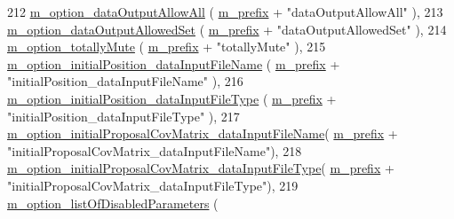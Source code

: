 \begin{DoxyCode}
212   \hyperlink{class_q_u_e_s_o_1_1_metropolis_hastings_s_g_options_a6d1f0f09fa5e238a54c6269c48fc6b29}{m\_option\_dataOutputAllowAll}                        (
      \hyperlink{class_q_u_e_s_o_1_1_metropolis_hastings_s_g_options_a4f7c510aaa530336d24259e2a89f5d0b}{m\_prefix} + \textcolor{stringliteral}{"dataOutputAllowAll"}                        ),
213   \hyperlink{class_q_u_e_s_o_1_1_metropolis_hastings_s_g_options_a7d12ea603c8aba9215ad462d51720204}{m\_option\_dataOutputAllowedSet}                      (
      \hyperlink{class_q_u_e_s_o_1_1_metropolis_hastings_s_g_options_a4f7c510aaa530336d24259e2a89f5d0b}{m\_prefix} + \textcolor{stringliteral}{"dataOutputAllowedSet"}                      ),
214   \hyperlink{class_q_u_e_s_o_1_1_metropolis_hastings_s_g_options_adc30bd8388e2da2b063671fc5ccad850}{m\_option\_totallyMute}                               (
      \hyperlink{class_q_u_e_s_o_1_1_metropolis_hastings_s_g_options_a4f7c510aaa530336d24259e2a89f5d0b}{m\_prefix} + \textcolor{stringliteral}{"totallyMute"}                               ),
215   \hyperlink{class_q_u_e_s_o_1_1_metropolis_hastings_s_g_options_a2dbb00eec372f529d21f770b0f220bd9}{m\_option\_initialPosition\_dataInputFileName}         (
      \hyperlink{class_q_u_e_s_o_1_1_metropolis_hastings_s_g_options_a4f7c510aaa530336d24259e2a89f5d0b}{m\_prefix} + \textcolor{stringliteral}{"initialPosition\_dataInputFileName"}         ),
216   \hyperlink{class_q_u_e_s_o_1_1_metropolis_hastings_s_g_options_ad997674bedeb76faf75773dc8c3dfd17}{m\_option\_initialPosition\_dataInputFileType}         (
      \hyperlink{class_q_u_e_s_o_1_1_metropolis_hastings_s_g_options_a4f7c510aaa530336d24259e2a89f5d0b}{m\_prefix} + \textcolor{stringliteral}{"initialPosition\_dataInputFileType"}         ),
217   \hyperlink{class_q_u_e_s_o_1_1_metropolis_hastings_s_g_options_a9d80faf22cf4d5614819ae5259463e89}{m\_option\_initialProposalCovMatrix\_dataInputFileName}(
      \hyperlink{class_q_u_e_s_o_1_1_metropolis_hastings_s_g_options_a4f7c510aaa530336d24259e2a89f5d0b}{m\_prefix} + \textcolor{stringliteral}{"initialProposalCovMatrix\_dataInputFileName"}),
218   \hyperlink{class_q_u_e_s_o_1_1_metropolis_hastings_s_g_options_a00116cfe535c1bea24a321f76c8c501a}{m\_option\_initialProposalCovMatrix\_dataInputFileType}(
      \hyperlink{class_q_u_e_s_o_1_1_metropolis_hastings_s_g_options_a4f7c510aaa530336d24259e2a89f5d0b}{m\_prefix} + \textcolor{stringliteral}{"initialProposalCovMatrix\_dataInputFileType"}),
219   \hyperlink{class_q_u_e_s_o_1_1_metropolis_hastings_s_g_options_ae3b9e124f89c653b2b2b09d97baa87ba}{m\_option\_listOfDisabledParameters}                  (

\end{DoxyCode}
